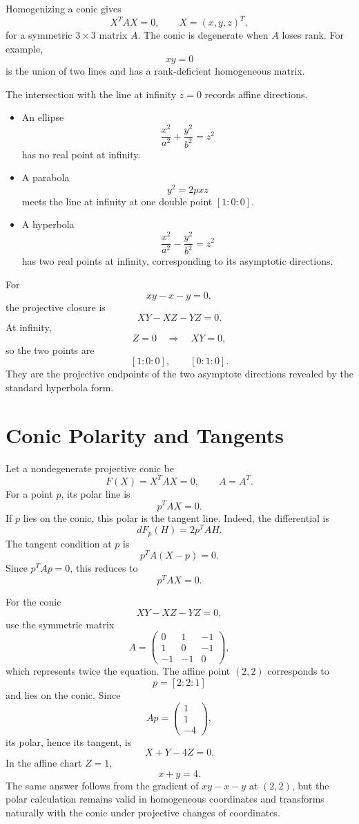 Homogenizing a conic gives
\[
  X^TAX=0,
  \qquad X=(x,y,z)^T,
\]
for a symmetric \(3\times3\) matrix \(A\).  The conic is degenerate when \(A\) loses rank.  For example,
\[
  xy=0
\]
is the union of two lines and has a rank-deficient homogeneous matrix.

The intersection with the line at infinity \(z=0\) records affine directions.

\begin{itemize}
  \item An ellipse
  \[
    \frac{x^2}{a^2}+\frac{y^2}{b^2}=z^2
  \]
  has no real point at infinity.
  \item A parabola
  \[
    y^2=2pxz
  \]
  meets the line at infinity at one double point \([1:0:0]\).
  \item A hyperbola
  \[
    \frac{x^2}{a^2}-\frac{y^2}{b^2}=z^2
  \]
  has two real points at infinity, corresponding to its asymptotic directions.
\end{itemize}

For
\[
  xy-x-y=0,
\]
the projective closure is
\[
  XY-XZ-YZ=0.
\]
At infinity,
\[
  Z=0
  \quad\Longrightarrow\quad
  XY=0,
\]
so the two points are
\[
  [1:0:0],
  \qquad
  [0:1:0].
\]
They are the projective endpoints of the two asymptote directions revealed by the standard hyperbola form.

\section{Conic Polarity and Tangents}

Let a nondegenerate projective conic be
\[
  F(X)=X^TAX=0,
  \qquad A=A^T.
\]
For a point \(p\), its polar line is
\[
  p^TAX=0.
\]
If \(p\) lies on the conic, this polar is the tangent line.  Indeed, the differential is
\[
  dF_p(H)=2p^TAH.
\]
The tangent condition at \(p\) is
\[
  p^TA(X-p)=0.
\]
Since \(p^TAp=0\), this reduces to
\[
  p^TAX=0.
\]

For the conic
\[
  XY-XZ-YZ=0,
\]
use the symmetric matrix
\[
  A=
  \begin{pmatrix}
    0&1&-1\\
    1&0&-1\\
    -1&-1&0
  \end{pmatrix},
\]
which represents twice the equation.  The affine point \((2,2)\) corresponds to
\[
  p=[2:2:1]
\]
and lies on the conic.  Since
\[
  Ap=
  \begin{pmatrix}1\\1\\-4\end{pmatrix},
\]
its polar, hence its tangent, is
\[
  X+Y-4Z=0.
\]
In the affine chart \(Z=1\),
\[
  \boxed{x+y=4.}
\]
The same answer follows from the gradient of \(xy-x-y\) at \((2,2)\), but the polar calculation remains valid in homogeneous coordinates and transforms naturally with the conic under projective changes of coordinates.